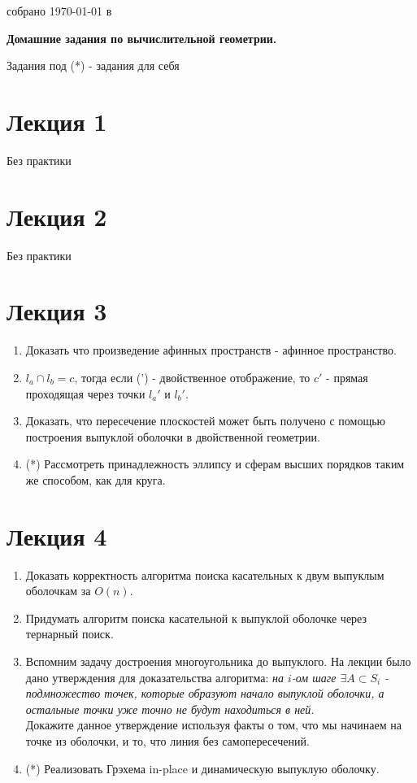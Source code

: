 \documentclass[12pt,a4paper,oneside]{article}
\begin{document}
\begin{flushright}

	{\large собрано {\today} в {\currenttime}}

\end{flushright}

\begin{center}
	{\Large \bf Домашние задания по вычислительной геометрии.}
\end{center}

Задания под (*) - задания для себя
\section*{Лекция 1}
	Без практики

\section*{Лекция 2}
	Без практики

\section*{Лекция 3}
	\begin{enumerate}
		\item Доказать что произведение афинных пространств - афинное пространство.
		\item $l_a\cap l_b = c$, тогда если (') - двойственное отображение, то $c'$ - прямая проходящая через точки $l_a'$ и $l_b'$.
		\item Доказать, что пересечение плоскостей может быть получено с помощью построения выпуклой оболочки в двойственной геометрии.
		\item (*) Рассмотреть принадлежность эллипсу и сферам высших порядков таким же способом, как для круга.
	\end{enumerate}
\section*{Лекция 4}
	\begin{enumerate}
		\item Доказать корректность алгоритма поиска касательных к двум выпуклым оболочкам за $O(n)$.
		\item Придумать алгоритм поиска касательной к выпуклой оболочке через тернарный поиск.
		\item Вспомним задачу достроения многоугольника до выпуклого. На лекции было дано утверждения для доказательства алгоритма: \textit{на $i$-ом шаге $\exists A \subset S_i$ - подмножество точек, которые образуют начало выпуклой оболочки, а остальные точки уже точно не будут находиться в ней.} \\
		Докажите данное утверждение используя факты о том, что мы начинаем на точке из оболочки, и то, что линия без самопересечений.
		\item (*) Реализовать Грэхема in-place и динамическую выпуклую оболочку.
	\end{enumerate}
\end{document}
